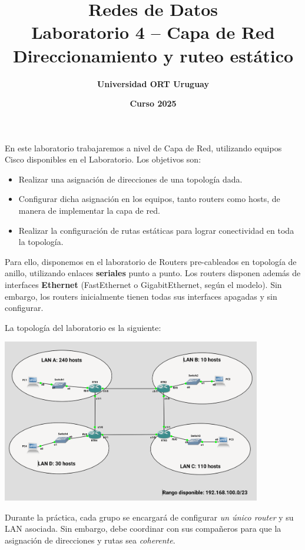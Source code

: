 \documentclass[a4paper,10pt]{article}
\title{\bf Redes de Datos\\Laboratorio 4 -- Capa de Red\\ Direccionamiento y ruteo estático}
\author{\bf Universidad ORT Uruguay}
\date{\bf Curso 2025}
\begin{document}
\maketitle
\thispagestyle{fancy}

En este laboratorio trabajaremos a nivel de Capa de Red, utilizando equipos Cisco disponibles en el Laboratorio. Los objetivos son:

\begin{itemize}
    \item Realizar una asignación de direcciones de una topología dada.
    \item Configurar dicha asignación en los equipos, tanto routers como hosts, de manera de implementar la capa de red.
    \item Realizar la configuración de rutas estáticas para lograr conectividad en toda la topología.
\end{itemize}

Para ello, disponemos en el laboratorio de Routers pre-cableados en topología de anillo, utilizando enlaces \textbf{seriales} punto a punto. Los routers disponen además de interfaces \textbf{Ethernet} (FastEthernet o GigabitEthernet, según el modelo). Sin embargo, los routers inicialmente tienen todas sus interfaces apagadas y sin configurar.

La topología del laboratorio es la siguiente:

\bigskip

\begin{center}
    \includegraphics[width=0.85\textwidth]{../figuras/topologia_lab.png}
\end{center}

Durante la práctica, cada grupo se encargará de configurar \emph{un único router} y su LAN asociada. Sin embargo, debe coordinar con sus compañeros para que la asignación de direcciones y rutas sea \emph{coherente}.
\end{document}
